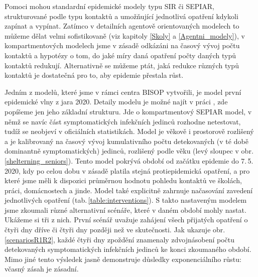 Pomoci mohou standardní epidemické modely typu SIR či SEPIAR, strukturované podle typu kontaktů a umožňující jednotlivá opatření kdykoli zapínat a vypínat. Zatímco v detailních agentově orientovaných modelech to můžeme dělat velmi sofistikovaně (viz kapitoly \ref{Skoly} a \ref{Agentni_modely}), v kompartmentových modelech jsme v zásadě odkázáni na časový vývoj počtu kontaktů a hypotézy o tom, do jaké míry daná opatření počty daných typů kontaktů redukují. Alternativně se můžeme ptát, jaká redukce různých typů kontaktů je dostatečná pro to, aby epidemie přestala růst.   

Jedním z modelů, které jsme v rámci centra BISOP vytvořili, je model první epidemické vlny z jara 2020. Detaily modelu je možné najít v práci \cite{Berec_modelB}, zde popíšeme jen jeho základní strukturu. Jde o kompartmentový SEPIAR model, v němž se navíc část symptomatických infekčních jedinců rozhodne netestovat, tudíž se neobjeví v oficiálních statistikách. Model je věkově i prostorově rozlišený a je kalibrovaný na časový vývoj kumulativního počtu detekovaných (v té době dominantně symptomatických) jedinců, rozlišený podle věku (levý sloupec v obr.\,\ref{shelterning_seniors}). Tento model pokrývá období od začátku epidemie do 7.\,5.\,2020, kdy po celou dobu v zásadě platila stejná protiepidemická opatření, a pro které jsme měli k dispozici průměrnou hodnotu pohledu kontaktů ve školách, práci, domácnostech a jinde. Model také explicitně zahrnuje načasování zavedení jednotlivých opatření (tab.\,\ref{table:interventions}). S takto nastaveným modelem jsme zkoumali různé alternativní scénáře, které v daném období mohly nastat. Ukážeme si tři z nich. První scénář uvažuje zahájení všech přijatých opatření o čtyři dny dříve či čtyři dny později než ve skutečnosti. Jak ukazuje obr.\,\ref{scenariosR1R2}, každé čtyři dny zpoždění znamenaly zdvojnásobení počtu detekovaných symptomatických infekčních jedinců ke konci zkoumaného období. Mimo jiné tento výsledek jasně demonstruje důsledky exponenciálního růstu: včasný zásah je zásadní. 

